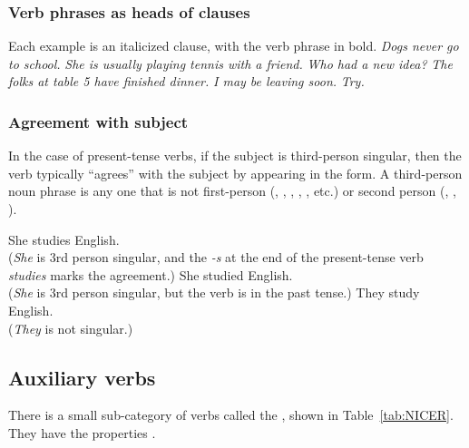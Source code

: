 \subsubsection*{Verb phrases as heads of clauses}
\label{sec:VPs_head_clauses}
Each example is an italicized clause, with the verb phrase in bold. \textit{Dogs \emph{never go to school}.}  \textit{She is \emph{usually playing tennis with a friend}.} \textit{Who \emph{had a new idea}?} \textit{The folks at table 5 \emph{have finished dinner}.} \textit{I \emph{may be leaving soon}.} \textit{\emph{Try.}}

\subsubsection*{Agreement with subject}\label{sec:agreement}
In the case of present-tense verbs, if the subject is third-person singular, then the verb typically \enquote{agrees} with the subject by appearing in the  form. A third-person noun phrase is any one that is not first-person (, , , , , etc.) or second person (, , ).

\ea
    \ea She studies English.\\(\emph{She} is 3rd person singular, and the \emph{-s} at the end of the present-tense verb \emph{studies} marks the agreement.)
    \ex She studied English.\\(\emph{She} is 3rd person singular, but the verb is in the past tense.)
    \ex They study English.\\(\emph{They} is not singular.)
    \z
\z{}

\subsection{Auxiliary verbs}\label{sec:aux}

There is a small sub-category of verbs called the , shown in Table~\ref{tab:NICER}. They have the  properties \citep{sag2019}.

